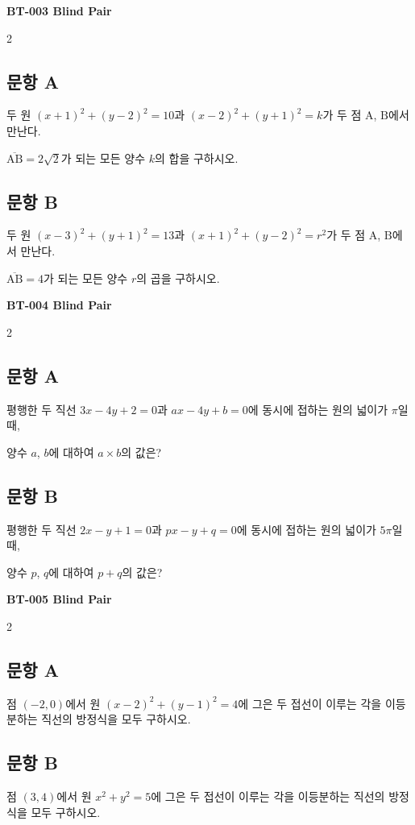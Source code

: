 \documentclass[11pt]{article}
\newcommand{\pairheader}[1]{%
  \begin{center}\textbf{\LARGE #1 Blind Pair}\end{center}
  \vspace{0.5cm}
}
\newcommand{\itemhead}[1]{\subsection*{\centering #1}\vspace{0.3cm}}
\begin{document}
\newpage

\pairheader{BT-003}

\begin{multicols}{2}
\itemhead{문항 A}

두 원 $(x+1)^2 + (y-2)^2 = 10$과 $(x-2)^2 + (y+1)^2 = k$가 두 점 $\mathrm{A}$, $\mathrm{B}$에서 만난다.

\vspace{0.5em}

$\overline{\mathrm{AB}} = 2\sqrt{2}$가 되는 모든 양수 $k$의 합을 구하시오.

\columnbreak

\itemhead{문항 B}

두 원 $(x-3)^2 + (y+1)^2 = 13$과 $(x+1)^2 + (y-2)^2 = r^2$가 두 점 $\mathrm{A}$, $\mathrm{B}$에서 만난다.

\vspace{0.5em}

$\overline{\mathrm{AB}} = 4$가 되는 모든 양수 $r$의 곱을 구하시오.
\end{multicols}

\newpage

\pairheader{BT-004}

\begin{multicols}{2}
\itemhead{문항 A}

평행한 두 직선 $3x - 4y + 2 = 0$과 $ax - 4y + b = 0$에 동시에 접하는 원의 넓이가 $\pi$일 때,

\vspace{0.5em}

양수 $a$, $b$에 대하여 $a \times b$의 값은?

\columnbreak

\itemhead{문항 B}

평행한 두 직선 $2x - y + 1 = 0$과 $px - y + q = 0$에 동시에 접하는 원의 넓이가 $5\pi$일 때,

\vspace{0.5em}

양수 $p$, $q$에 대하여 $p + q$의 값은?
\end{multicols}

\newpage

\pairheader{BT-005}

\begin{multicols}{2}
\itemhead{문항 A}

점 $(-2, 0)$에서 원 $(x-2)^2 + (y-1)^2 = 4$에 그은 두 접선이 이루는 각을 이등분하는 직선의 방정식을 모두 구하시오.

\columnbreak

\itemhead{문항 B}

점 $(3, 4)$에서 원 $x^2 + y^2 = 5$에 그은 두 접선이 이루는 각을 이등분하는 직선의 방정식을 모두 구하시오.
\end{multicols}
\end{document}

